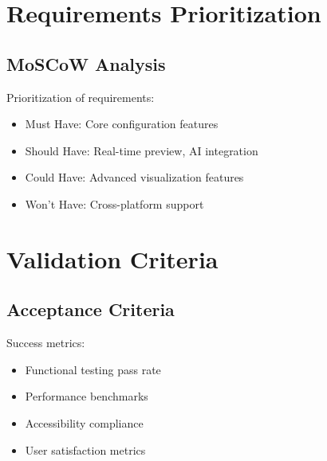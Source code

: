 \section{Requirements Prioritization}
\subsection{MoSCoW Analysis}
Prioritization of requirements:
\begin{itemize}
    \item Must Have: Core configuration features
    \item Should Have: Real-time preview, AI integration
    \item Could Have: Advanced visualization features
    \item Won't Have: Cross-platform support
\end{itemize}

\section{Validation Criteria}
\subsection{Acceptance Criteria}
Success metrics:
\begin{itemize}
    \item Functional testing pass rate
    \item Performance benchmarks
    \item Accessibility compliance
    \item User satisfaction metrics
\end{itemize}
